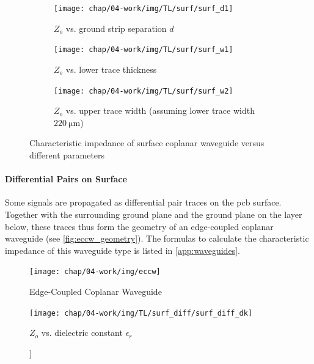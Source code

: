 \begin{figure}[tbh]
     \centering
     \begin{subfigure}[b]{\textwidth}
         \centering
         \texttt{[image: chap/04-work/img/TL/surf/surf\_d1]}
         \caption{$Z_o$ vs. ground strip separation $d$}
         \label{fig:surf_d1}
     \end{subfigure}
     
     \begin{subfigure}[b]{\textwidth}
         \centering
         \texttt{[image: chap/04-work/img/TL/surf/surf\_w1]}
         \caption{$Z_o$ vs. lower trace thickness}
         \label{fig:surf_w1}
     \end{subfigure}
     
     \begin{subfigure}[b]{\textwidth}
         \centering
         \texttt{[image: chap/04-work/img/TL/surf/surf\_w2]}
         \caption{$Z_o$ vs. upper trace width (assuming lower trace width $\SI{220}{\micro \meter}$) }
         \label{fig:surf_w2}
     \end{subfigure}
        \caption[Characteristic impedance of surface coplanar waveguide]{Characteristic impedance of surface coplanar waveguide versus different parameters}
        \label{fig:surf}
\end{figure}



\paragraph{Differential Pairs on Surface}
Some signals are propagated as differential pair traces on the \gls{pcb} surface.
Together with the surrounding ground plane and the ground plane on the layer below, these traces thus form the geometry of an edge-coupled coplanar waveguide (see \autoref{fig:eccw_geometry}). 
The formulas to calculate the characteristic impedance of this waveguide type is listed in \autoref{app:waveguides}.
\begin{figure}[tbh]
	\centering
	\texttt{[image: chap/04-work/img/eccw]}
	\caption{Edge-Coupled Coplanar Waveguide}
	\label{fig:eccw_geometry}
\end{figure}

\begin{figure}[tbh]
	\centering
	\texttt{[image: chap/04-work/img/TL/surf\_diff/surf\_diff\_dk]}
	\caption]{$Z_o$ vs. dielectric constant $\epsilon_r$}
	\label{fig:cwv_d1}
\end{figure}


